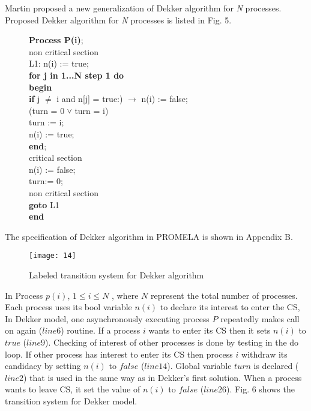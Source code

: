 \documentclass[conference]{IEEEtran}
\begin{document}
Martin \cite{14} proposed a new generalization of Dekker algorithm for \emph{N} processes. Proposed Dekker algorithm for \emph{N} processes is listed 
in Fig. 5.
\begin{figure}[!ht]
\hspace{.2cm}\textbf{Process P(i)};\\
\hspace*{.3cm}non critical section\\
\hspace*{.3cm}L1: n(i) := true;\\
\hspace*{.4cm}\textbf{for j in 1...N step 1 do}\\
\hspace*{.5cm}\textbf{begin}\\
\hspace*{.6cm}\textbf{if} j $\neq$ i and n[j] =  true:) $\rightarrow$ n(i) := false;\\
\hspace*{4cm}(turn = 0 ˅ turn = i)\\
\hspace*{.6cm}turn := i;\\
\hspace*{.6cm}n(i) := true;\\
\hspace*{.5cm}\textbf{end};\\
\hspace*{.3cm} critical section\\
\hspace*{.3cm}n(i) := false;\\
\hspace*{.3cm}turn:= 0;\\
\hspace*{.3cm}non critical section\\
\hspace*{.3cm}\textbf{goto} L1\\
\hspace*{.2cm}\textbf{end}
\label{Generalized Dekker algorithm for N processes}
\end{figure}

The specification of Dekker algorithm in PROMELA is shown in Appendix B. 
\begin{figure}[!ht]
\centering\texttt{[image: 14]}
\caption{Labeled transition system for Dekker algorithm} 
\end{figure}

In Process $p(i)$, $1 \leq i \leq N$ , where $N$ represent the total number of processes. Each process uses its bool variable $n(i)$ to declare 
its interest to enter the CS, In Dekker model, one asynchronously executing process $P$ repeatedly makes call on again ($line 6$) routine. 
If a process $i$ wants to enter its CS then it sets $n(i)$ to $true$ ($line 9$). Checking of interest of other processes is done by testing 
in the do loop. If other process has interest to enter its CS then process $i$ withdraw its candidacy by setting $n(i)$ to $false$ ($line 14$). 
Global variable $turn$ is declared ($line 2$) that is used in the same way as in Dekker’s first solution. When a process wants to leave CS, 
it set the value of $n(i)$ to $false$ ($line 26$). Fig. 6 shows the transition system for Dekker model.
\end{document}
